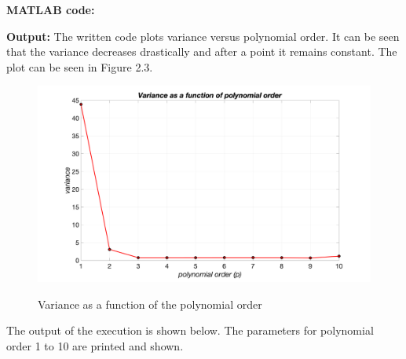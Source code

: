 \noindent \textbf{MATLAB code:}

\noindent \textbf{Output:} The written code plots variance versus polynomial order. It can be seen that the  variance decreases drastically and after a point it remains constant. The plot can be seen in Figure 2.3.
\begin{figure}[H]
\centering
{\includegraphics[scale=0.16]{ass4_1.png}}
\caption{Variance as a function of the polynomial order}
\label{Variance as a function of the polynomial order}
\end{figure}
\newpage
\noindent The output of the execution is shown below. The parameters for polynomial order 1 to 10 are printed and shown.
